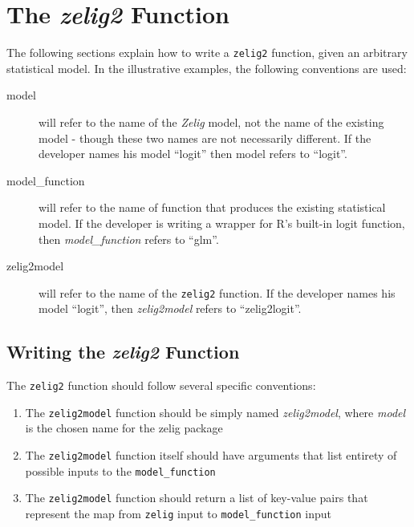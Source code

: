\documentclass[11pt]{article}
\begin{document}
\section{The \emph{zelig2} Function}
The following sections explain how to write a {\tt zelig2} function, given an arbitrary
statistical model.  In the illustrative examples, the following conventions are used:



\begin{description}

	\item[model] will refer to the name of the \emph{Zelig} model, not the name of the
		existing model - though these two names are not necessarily different.  If the developer
		names his model ``logit'' then model refers to ``logit''.

	\item[model\_function] will refer to the name of function that produces the existing
		statistical model.  If the developer is writing a wrapper for R's built-in logit function,
		then \emph{model\_function} refers to ``glm''.
		
	\item[zelig2model] will refer to the name of the {\tt zelig2} function.  If the developer
		names his model ``logit'', then \emph{zelig2model} refers to ``zelig2logit''.
		
\end{description}


\subsection{Writing the \emph{zelig2} Function}

The {\tt zelig2} function should follow several specific conventions:

\begin{enumerate}

	\item The {\tt zelig2model} function should be simply named \emph{zelig2model}, where
		\emph{model} is the chosen name for the zelig package

	\item The {\tt zelig2model} function itself should have arguments that list entirety of
		possible inputs to the {\tt model\_function}

	\item The {\tt zelig2model} function should return a list of key-value pairs that represent
		the map from {\tt zelig} input to {\tt model\_function} input

\end{enumerate}
\end{document}
